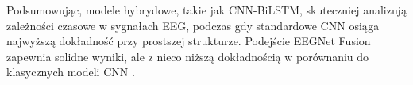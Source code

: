 \documentclass[eeg_v4.tex]{subfiles}
\begin{document}
    Podsumowując, modele hybrydowe, takie jak CNN-BiLSTM, skuteczniej analizują zależności czasowe w sygnałach EEG,
    podczas gdy standardowe CNN osiąga najwyższą dokładność przy prostszej strukturze. Podejście EEGNet Fusion zapewnia
    solidne wyniki, ale z nieco niższą dokładnością w porównaniu do klasycznych modeli CNN
    \cite{boutarfaia2023,roots2020}.
\end{document}
